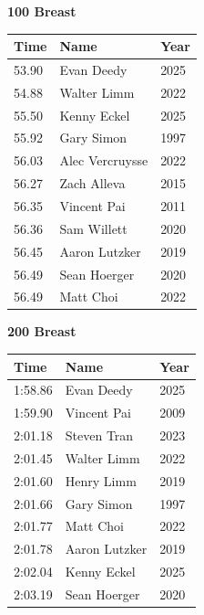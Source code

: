 \vspace{1.2em}
\noindent\begin{minipage}[t]{0.48\textwidth}
\centering
\textbf{\textcolor{teamprimary}{100 Breast}}\par
\vspace{0.5em}
\centering
\small
\renewcommand{\arraystretch}{1.0}
\setlength{\tabcolsep}{4pt}
\begin{tabular}{@{}p{1.8cm}p{3.0cm}p{1.0cm}@{}}
\toprule
\textbf{Time} & \textbf{Name} & \textbf{Year} \\
\midrule
53.90 & Evan Deedy & 2025 \\
54.88 & Walter Limm & 2022 \\
55.50 & Kenny Eckel & 2025 \\
55.92 & Gary Simon & 1997 \\
56.03 & Alec Vercruysse & 2022 \\
56.27 & Zach Alleva & 2015 \\
56.35 & Vincent Pai & 2011 \\
56.36 & Sam Willett & 2020 \\
56.45 & Aaron Lutzker & 2019 \\
56.49 & Sean Hoerger & 2020 \\
56.49 & Matt Choi & 2022 \\
\bottomrule
\end{tabular}
\end{minipage}
\hfill
\begin{minipage}[t]{0.48\textwidth}
\centering
\textbf{\textcolor{teamprimary}{200 Breast}}\par
\vspace{0.5em}
\centering
\small
\renewcommand{\arraystretch}{1.0}
\setlength{\tabcolsep}{4pt}
\begin{tabular}{@{}p{1.8cm}p{3.0cm}p{1.0cm}@{}}
\toprule
\textbf{Time} & \textbf{Name} & \textbf{Year} \\
\midrule
1:58.86 & Evan Deedy & 2025 \\
1:59.90 & Vincent Pai & 2009 \\
2:01.18 & Steven Tran & 2023 \\
2:01.45 & Walter Limm & 2022 \\
2:01.60 & Henry Limm & 2019 \\
2:01.66 & Gary Simon & 1997 \\
2:01.77 & Matt Choi & 2022 \\
2:01.78 & Aaron Lutzker & 2019 \\
2:02.04 & Kenny Eckel & 2025 \\
2:03.19 & Sean Hoerger & 2020 \\
\bottomrule
\end{tabular}
\end{minipage}
